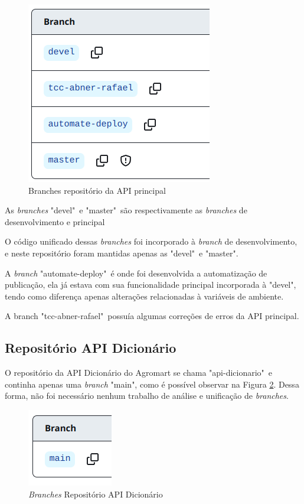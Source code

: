 \begin{figure}[h]
	\centering
	\includegraphics[keepaspectratio=true,scale=0.5]{figuras/branches_api.png}
	\caption{Branches repositório da API principal}
        \label{branches_api_principal}
\end{figure}

As \textit{branches} "devel"\ e "master"\ são respectivamente as \textit{branches} de desenvolvimento e principal

O código unificado dessas \textit{branches} foi incorporado à \textit{branch} de desenvolvimento, e neste repositório foram mantidas apenas as "devel"\ e "master".

A \textit{branch} "automate-deploy"\ é onde foi desenvolvida a automatização de publicação, ela já estava com sua funcionalidade principal incorporada à "devel", tendo como diferença apenas alterações relacionadas à variáveis de ambiente. 

A branch "tcc-abner-rafael"\ possuía algumas correções de erros da API principal.

\subsection{Repositório API Dicionário}
O repositório da API Dicionário do Agromart se chama "api-dicionario"\ e continha apenas uma \textit{branch} "main", como é possível observar na Figura \ref{branches-dicionario}. Dessa forma, não foi necessário nenhum trabalho de análise e unificação de \textit{branches}.

\begin{figure}[h]
	\centering
	\includegraphics[keepaspectratio=true,scale=0.5]{figuras/branches_api_dicionario.png}
	\caption{\textit{Branches} Repositório API Dicionário}
        \label{branches-dicionario}
\end{figure}



